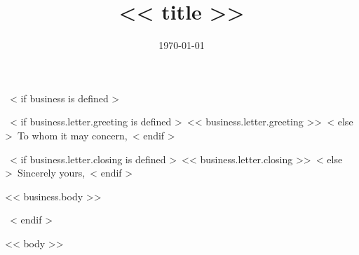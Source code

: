 \documentclass[<< theme.font_size >>, << theme.font_type >>, << theme.paper_size >>]{moderncv}
\title{<< title >>}
\begin{document}
~< if business is defined >~
\date{\today}
\opening{~< if business.letter.greeting is defined >~<< business.letter.greeting >>~< else >~To whom it may concern,~< endif >~}
\closing{~< if business.letter.closing is defined >~<< business.letter.closing >>~< else >~Sincerely yours,~< endif >~}

\makelettertitle            %
<< business.body >>

\makeletterclosing          %
\newpage
\setcounter{page}{1}
~< endif >~


\makecvtitle
\vspace{-20pt}

<< body >>
\end{document}
